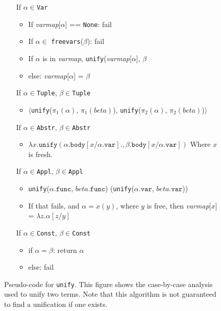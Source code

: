 \documentclass[11pt]{article}
\begin{document}
\begin{figure}
\noindent
\begin{boxedminipage}{\textwidth}
\begin{itemize}
\item[If] $\alpha \in $\texttt{Var}
\begin{itemize}
  \item If \textit{varmap}[$\alpha$] == \texttt{None}: fail
  \item If $\alpha \in$ \texttt{freevars}($\beta$): fail
  \item If $\alpha$ is in \textit{varmap},
      \texttt{unify}(\textit{varmap}[$\alpha$], $\beta$
  \item else: \textit{varmap}[$\alpha$] = $\beta$
\end{itemize}
\item[If] $\alpha \in $\texttt{Tuple}, $\beta \in $\texttt{Tuple}
\begin{itemize}
  \item $\langle$\texttt{unify}($\pi_1(\alpha)$, $\pi_1(beta)$),
         \texttt{unify}($\pi_2(\alpha)$, $\pi_2(beta)$)$\rangle$
\end{itemize}
\item[If] $\alpha \in $\texttt{Abstr}, $\beta \in $\texttt{Abstr}
\begin{itemize}
\item $\lambda x.\texttt{unify}(\alpha.\texttt{body}[x/\alpha.\texttt{var}]., 
      \beta.\texttt{body}[x/\alpha.\texttt{var}])$
    Where $x$ is fresh.
\end{itemize}
\item[If] $\alpha \in $\texttt{Appl}, $\beta \in $\texttt{Appl}
\begin{itemize}
  \item \texttt{unify}($\alpha.\texttt{func}$, $beta.\texttt{func}$)
        (\texttt{unify}($\alpha.\texttt{var}$, $beta.\texttt{var}$))
  \item If that fails, and $\alpha = x(y)$, where $y$ is free, then
        \textit{varmap}[$x$] = $\lambda z.\alpha[z/y]$
\end{itemize}
\item[If] $\alpha \in $\texttt{Const}, $\beta \in $\texttt{Const}
\begin{itemize}
\item if $\alpha = \beta$: return $\alpha$
\item else: fail
\end{itemize}
\end{itemize}
\vspace{2mm}
\end{boxedminipage}
\caption[Pseudo-code for \texttt{unify}]{Pseudo-code for
\texttt{unify}.  This figure shows the case-by-case analysis
used to unify two terms.  Note that this algorithm is not guaranteed
to find a unification if one exists.}
\label{fig:unify}
\end{figure}
\end{document}
